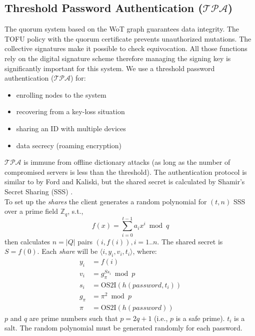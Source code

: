 \subsection{Threshold Password Authentication ($\mathcal{TPA}$)}
\label{auth}
The quorum system based on the WoT graph guarantees data
integrity. The TOFU policy with the quorum certificate prevents
unauthorized mutations. The collective signatures make it possible to
check equivocation. All those functions rely on the digital signature
scheme therefore managing the signing key is significantly
important for this system. We use a threshold password authentication
($\mathcal{TPA}$) for:
\begin{itemize}
\item enrolling nodes to the system
\item recovering from a key-loss situation
\item sharing an ID with multiple devices
\item data secrecy (roaming encryption)
\end{itemize}
$\mathcal{TPA}$ is immune from offline dictionary attacks (as long as
the number of compromised servers is less than the threshold). The
authentication protocol is similar to \cite{ford} by Ford and Kaliski,
but the shared secret is calculated by Shamir's Secret Sharing (SSS)
\cite{shamir}.\\

To set up the {\em shares} the client generates a random polynomial
for $(t, n)$ SSS over a prime field $\mathbb{Z}_q$, s.t.,
\[
  f(x) = \sum_{i=0}^{t-1}a_ix^i \bmod q
\]
then calculates $n=|Q|$ pairs $(i,f(i)), i = 1..n$. The shared secret
is $S = f(0)$. Each {\em share} will be $\langle i, y_i, v_i, t_i
\rangle$,
where:
\begin{align*}
  y_i &= f(i) \\
  v_i &= g_{\pi}^{Ss_i} \bmod p \\
  s_i &= \text{OS2I}(h(password, t_i)) \\
  g_{\pi} &= \pi^2 \bmod p \\
  \pi &= \text{OS2I}(h(password))
\end{align*}
$p$ and $q$ are prime numbers such that $p = 2q + 1$ (i.e., $p$ is a
safe prime). $t_i$ is a salt. The random polynomial must be generated
randomly for each password.\\

